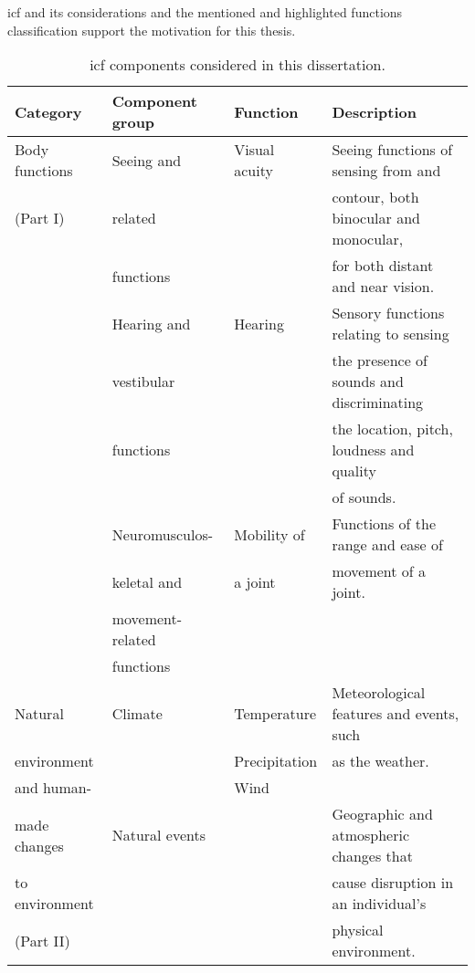 

\ac{icf} and its considerations and the mentioned and highlighted functions
classification support the motivation for this thesis.

\begin{table}
  \caption{\ac{icf} components considered in this dissertation.}
  \label{tbl:icf}
  \footnotesize
  \centering
  \begin{tabular}{l l l l}
    \hline
    \textbf{Category} 	& \textbf{Component group}& \textbf{Function}& \textbf{Description}\\
    \hline
    Body functions& Seeing and 	 	& Visual acuity	& Seeing functions of sensing from and	\\
    (Part I)	& related		& 		& contour, both binocular and monocular,\\
		& functions		& 		& for both distant and near vision.	\\
		& Hearing and 		& Hearing 	& Sensory functions relating to sensing \\
		& vestibular		& 		& the presence of sounds and discriminating\\
		& functions		& 		& the location, pitch, loudness and quality\\
		& 			&		& of sounds.				\\
		& Neuromusculos- 	& Mobility of 	& Functions of the range and ease of	\\ 
		& keletal and 		& a joint	& movement of a joint.			\\
		& movement-related 	& 		& 					\\
		& functions		&		&					\\
    \hline
    Natural 	& Climate		& Temperature	& Meteorological features and events, such\\
    environment & 			& Precipitation	& as the weather.			\\
    and human-	&			& Wind		& 					\\
    made changes& Natural events	& 		& Geographic and atmospheric changes that\\
    to environment& 			& 		& cause disruption in an individual's 	\\
    (Part II)	& 			& 		& physical environment.			\\

\end{tabular}
\end{table}
